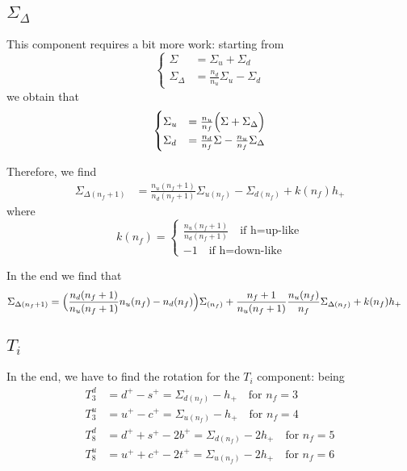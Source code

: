 \documentclass[a4paper,oneside]{article}
\begin{document}
\subsection{$\Sigma_{\Delta}$}
This component requires a bit more work: starting from
\begin{equation*}
\begin{cases}
\Sigma &= \Sigma_u+\Sigma_d \\
\Sigma_{\Delta} &= \frac{n_d}{n_u}\Sigma_u-\Sigma_d
\end{cases}
\end{equation*}
we obtain that
\begin{equation*}
\begin{cases}
\Sigma_u &= \frac{n_u}{n_f}\Bigl(\Sigma+\Sigma_{\Delta} \Bigr)\\
\Sigma_d &= \frac{n_d}{n_f}\Sigma-\frac{n_u}{n_f}\Sigma_{\Delta}
\end{cases}
\end{equation*}

Therefore, we find
\begin{align*}
\Sigma_{\Delta(n_f+1)} &= \frac{n_u(n_f+1)}{n_d(n_f+1)}\Sigma_{u(n_f)} - \Sigma_{d(n_f)} + k(n_f) h_+
\end{align*}
where
\begin{equation*}
k(n_f) =
\begin{cases}
 \frac{n_u(n_f+1)}{n_d(n_f+1)} \quad \text{if h=up-like}\\
-1  \quad \text{if h=down-like}
\end{cases}
\end{equation*}

In the end we find that
\begin{align*}
\Sigma_{\Delta(n_f+1)} &= \Bigl(\frac{n_d(n_f+1)}{n_u(n_f+1)}n_u(n_f)-n_d(n_f)\Bigr)\Sigma_{(n_f)} + \frac{n_f+1}{n_u(n_f+1)}\frac{n_u(n_f)}{n_f}\Sigma_{\Delta(n_f)} + k(n_f) h_+
\end{align*}

\subsection{$T_i$}
In the end, we have to find the rotation for the $T_i$ component: being
\begin{align*}
T_3^d &=d^+ - s^+ = \Sigma_{d(n_f)} - h_+\quad \text{for $n_f=3$}\\
T_3^u &=u^+ - c^+ =\Sigma_{u(n_f)} - h_+\quad \text{for $n_f=4$}\\
T_8^d &=d^+ + s^+ - 2b^+ =\Sigma_{d(n_f)} - 2h_+\quad \text{for $n_f=5$}\\
T_8^u &=u^+ + c^+ - 2t^+ =\Sigma_{u(n_f)} - 2h_+\quad \text{for $n_f=6$}
\end{align*}
\end{document}
